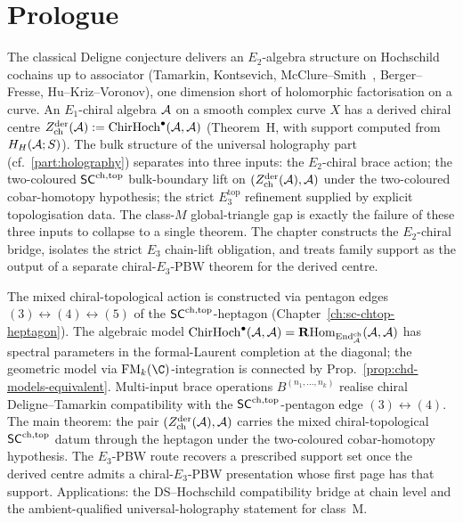\section*{Prologue}

The classical Deligne conjecture delivers an $E_2$-algebra structure
on Hochschild cochains up to associator (Tamarkin, Kontsevich,
McClure--Smith~\cite{McClureSmith02}, Berger--Fresse, Hu--Kriz--Voronov), one dimension
short of holomorphic factorisation on a curve. An $E_1$-chiral
algebra $\mathcal{A}$ on a smooth complex curve $X$ has a derived chiral
centre
$Z^{\mathrm{der}}_{\mathrm{ch}}(\mathcal{A}) := \mathrm{ChirHoch}^\bullet(\mathcal{A}, \mathcal{A})$
(Theorem~H, with support computed from $H_H(\mathcal{A};S)$). The bulk structure of
the universal holography part (cf.~\ref{part:holography})
separates into three inputs: the $E_2$-chiral brace action; the
two-coloured $\mathsf{SC}^{\mathrm{ch},\mathrm{top}}$ bulk-boundary lift on
$(Z^{\mathrm{der}}_{\mathrm{ch}}(\mathcal{A}),\mathcal{A})$ under the
two-coloured cobar-homotopy hypothesis; the strict
$E_3^{\mathrm{top}}$ refinement supplied by explicit topologisation
data. The class-$M$ global-triangle gap is exactly the failure of
these three inputs to collapse to a single theorem. The chapter
constructs the $E_2$-chiral bridge, isolates the strict $E_3$
chain-lift obligation, and treats family support as the output of a
separate chiral-$E_3$-PBW theorem for the derived centre.

The mixed chiral-topological action is constructed via pentagon
edges $(3)\leftrightarrow(4)\leftrightarrow(5)$ of the
$\mathsf{SC}^{\mathrm{ch},\mathrm{top}}$-heptagon (Chapter~\ref{ch:sc-chtop-heptagon}). The
algebraic model $\mathrm{ChirHoch}^\bullet(\mathcal{A},\mathcal{A}) =
\mathbf{R}\mathrm{Hom}_{\mathrm{End}^{\mathrm{ch}}_{\mathcal{A}}}(\mathcal{A},\mathcal{A})$ has spectral parameters
in the formal-Laurent completion at the diagonal; the geometric
model via $\FM_k(\C)$-integration is connected by
Prop.~\ref{prop:chd-models-equivalent}. Multi-input brace
operations $B^{(n_1,\ldots,n_k)}$ realise chiral Deligne--Tamarkin
compatibility with the $\mathsf{SC}^{\mathrm{ch},\mathrm{top}}$-pentagon edge
$(3)\leftrightarrow(4)$. The main theorem: the pair
$(Z^{\mathrm{der}}_{\mathrm{ch}}(\mathcal{A}),\mathcal{A})$ carries the mixed
chiral-topological $\mathsf{SC}^{\mathrm{ch},\mathrm{top}}$ datum through the heptagon under
the two-coloured cobar-homotopy hypothesis.  The $E_3$-PBW route
recovers a prescribed support set once the derived centre admits a
chiral-$E_3$-PBW presentation whose first page has that support.
Applications: the DS--Hochschild compatibility bridge at chain
level and the ambient-qualified universal-holography statement
for class~M.

